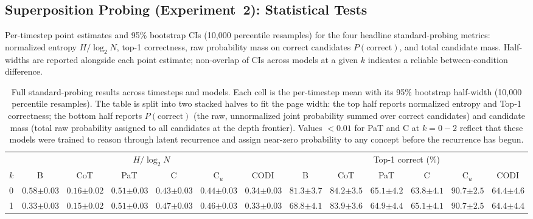\subsection{Superposition Probing (Experiment~2): Statistical Tests}
\label{app:superposition_stats}

Per-timestep point estimates and 95\% bootstrap CIs (10{,}000 percentile resamples) for the four headline standard-probing metrics: normalized entropy $H/\log_2 N$, top-1 correctness, raw probability mass on correct candidates $P(\text{correct})$, and total candidate mass. Half-widths are reported alongside each point estimate; non-overlap of CIs across models at a given $k$ indicates a reliable between-condition difference.

\begin{table}[!t]
\centering
\tiny
\setlength{\tabcolsep}{3pt}
\caption{Full standard-probing results across timesteps and models. Each cell is the per-timestep mean with its 95\% bootstrap half-width (10{,}000 percentile resamples). The table is split into two stacked halves to fit the page width: the top half reports normalized entropy and Top-1 correctness; the bottom half reports $P(\text{correct})$ (the raw, unnormalized joint probability summed over correct candidates) and candidate mass (total raw probability assigned to all candidates at the depth frontier). Values $<0.01$ for PaT and C at $k{=}0{-}2$ reflect that these models were trained to reason through latent recurrence and assign near-zero probability to any concept before the recurrence has begun.}
\begin{tabular}{l cccccc cccccc}
\toprule
 & \multicolumn{6}{c}{$H/\log_2 N$} & \multicolumn{6}{c}{Top-1 correct (\%)} \\
\cmidrule(lr){2-7} \cmidrule(lr){8-13}
$k$ & B & CoT & PaT & C & C$_u$ & CODI & B & CoT & PaT & C & C$_u$ & CODI \\
\midrule
0 & $0.58 {\scriptstyle \pm 0.03}$ & $0.16 {\scriptstyle \pm 0.02}$ & $0.51 {\scriptstyle \pm 0.03}$ & $0.43 {\scriptstyle \pm 0.03}$ & $0.44 {\scriptstyle \pm 0.03}$ & $0.34 {\scriptstyle \pm 0.03}$ & $81.3 {\scriptstyle \pm 3.7}$ & $84.2 {\scriptstyle \pm 3.5}$ & $65.1 {\scriptstyle \pm 4.2}$ & $63.8 {\scriptstyle \pm 4.1}$ & $90.7 {\scriptstyle \pm 2.5}$ & $64.4 {\scriptstyle \pm 4.6}$ \\
1 & $0.33 {\scriptstyle \pm 0.03}$ & $0.15 {\scriptstyle \pm 0.02}$ & $0.51 {\scriptstyle \pm 0.03}$ & $0.47 {\scriptstyle \pm 0.03}$ & $0.46 {\scriptstyle \pm 0.03}$ & $0.33 {\scriptstyle \pm 0.03}$ & $68.8 {\scriptstyle \pm 4.1}$ & $83.9 {\scriptstyle \pm 3.6}$ & $64.9 {\scriptstyle \pm 4.4}$ & $65.1 {\scriptstyle \pm 4.1}$ & $90.7 {\scriptstyle \pm 2.5}$ & $64.4 {\scriptstyle \pm 4.4}$ \\

\end{tabular}
\end{table}
